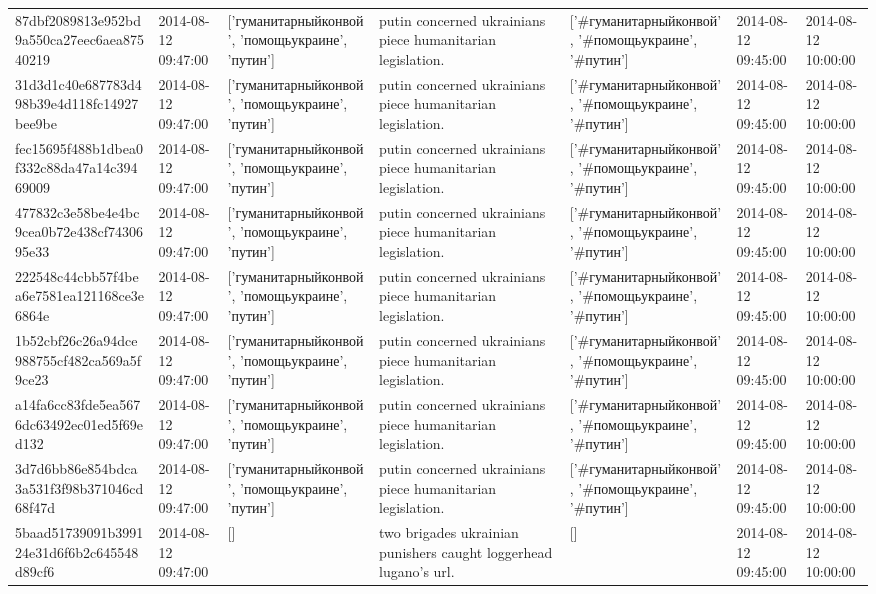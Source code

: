 \begin{tabular}{lllllll}
87dbf2089813e952bd9a550ca27eec6aea87540219 & 2014-08-12 09:47:00 & ['гуманитарныйконвой', 'помощьукраине', 'путин'] & putin concerned ukrainians piece humanitarian legislation. & ['#гуманитарныйконвой', '#помощьукраине', '#путин'] & 2014-08-12 09:45:00 & 2014-08-12 10:00:00 \\
31d3d1c40e687783d498b39e4d118fc14927bee9be & 2014-08-12 09:47:00 & ['гуманитарныйконвой', 'помощьукраине', 'путин'] & putin concerned ukrainians piece humanitarian legislation. & ['#гуманитарныйконвой', '#помощьукраине', '#путин'] & 2014-08-12 09:45:00 & 2014-08-12 10:00:00 \\
fec15695f488b1dbea0f332c88da47a14c39469009 & 2014-08-12 09:47:00 & ['гуманитарныйконвой', 'помощьукраине', 'путин'] & putin concerned ukrainians piece humanitarian legislation. & ['#гуманитарныйконвой', '#помощьукраине', '#путин'] & 2014-08-12 09:45:00 & 2014-08-12 10:00:00 \\
477832c3e58be4e4bc9cea0b72e438cf7430695e33 & 2014-08-12 09:47:00 & ['гуманитарныйконвой', 'помощьукраине', 'путин'] & putin concerned ukrainians piece humanitarian legislation. & ['#гуманитарныйконвой', '#помощьукраине', '#путин'] & 2014-08-12 09:45:00 & 2014-08-12 10:00:00 \\
222548c44cbb57f4bea6e7581ea121168ce3e6864e & 2014-08-12 09:47:00 & ['гуманитарныйконвой', 'помощьукраине', 'путин'] & putin concerned ukrainians piece humanitarian legislation. & ['#гуманитарныйконвой', '#помощьукраине', '#путин'] & 2014-08-12 09:45:00 & 2014-08-12 10:00:00 \\
1b52cbf26c26a94dce988755cf482ca569a5f9ce23 & 2014-08-12 09:47:00 & ['гуманитарныйконвой', 'помощьукраине', 'путин'] & putin concerned ukrainians piece humanitarian legislation. & ['#гуманитарныйконвой', '#помощьукраине', '#путин'] & 2014-08-12 09:45:00 & 2014-08-12 10:00:00 \\
a14fa6cc83fde5ea5676dc63492ec01ed5f69ed132 & 2014-08-12 09:47:00 & ['гуманитарныйконвой', 'помощьукраине', 'путин'] & putin concerned ukrainians piece humanitarian legislation. & ['#гуманитарныйконвой', '#помощьукраине', '#путин'] & 2014-08-12 09:45:00 & 2014-08-12 10:00:00 \\
3d7d6bb86e854bdca3a531f3f98b371046cd68f47d & 2014-08-12 09:47:00 & ['гуманитарныйконвой', 'помощьукраине', 'путин'] & putin concerned ukrainians piece humanitarian legislation. & ['#гуманитарныйконвой', '#помощьукраине', '#путин'] & 2014-08-12 09:45:00 & 2014-08-12 10:00:00 \\
5baad51739091b399124e31d6f6b2c645548d89cf6 & 2014-08-12 09:47:00 & [] & two brigades ukrainian punishers caught loggerhead lugano's url. & [] & 2014-08-12 09:45:00 & 2014-08-12 10:00:00 \\

\end{tabular}
